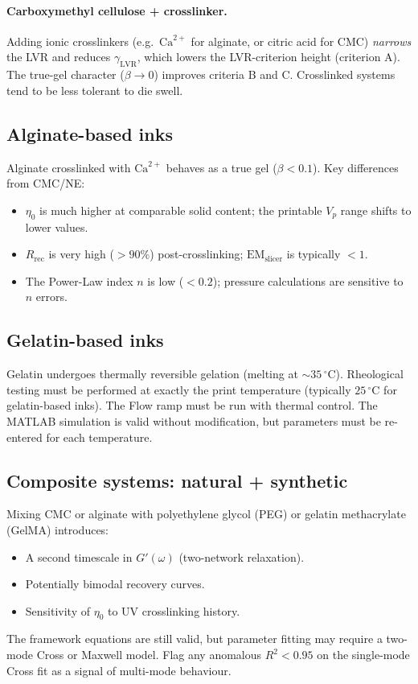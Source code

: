 \documentclass[11pt,a4paper]{article}
\begin{document}
\paragraph{Carboxymethyl cellulose + crosslinker.} Adding ionic
crosslinkers (e.g.\ $\mathrm{Ca}^{2+}$ for alginate, or citric acid
for CMC) \emph{narrows} the LVR and reduces $\gamma_\mathrm{LVR}$, which
lowers the LVR-criterion height (criterion A). The true-gel character
($\beta\to 0$) improves criteria B and C. Crosslinked systems tend to
be less tolerant to die swell.

\subsection{Alginate-based inks}

Alginate crosslinked with $\mathrm{Ca}^{2+}$ behaves as a true gel
($\beta<0.1$). Key differences from CMC/NE:
\begin{itemize}[leftmargin=1.6em,itemsep=2pt]
\item $\eta_0$ is much higher at comparable solid content; the
  printable $V_p$ range shifts to lower values.
\item $R_\mathrm{rec}$ is very high ($>90\%$) post-crosslinking;
  $\mathrm{EM}_\mathrm{slicer}$ is typically $<1$.
\item The Power-Law index $n$ is low ($<0.2$); pressure calculations
  are sensitive to $n$ errors.
\end{itemize}

\subsection{Gelatin-based inks}

Gelatin undergoes thermally reversible gelation (melting at $\sim 35\,^\circ$C).
Rheological testing must be performed at exactly the print temperature
(typically $25\,^\circ$C for gelatin-based inks). The Flow ramp must
be run with thermal control. The MATLAB simulation is valid without
modification, but parameters must be re-entered for each temperature.

\subsection{Composite systems: natural + synthetic}

Mixing CMC or alginate with polyethylene glycol (PEG) or gelatin
methacrylate (GelMA) introduces:
\begin{itemize}[leftmargin=1.6em,itemsep=2pt]
\item A second timescale in $G'(\omega)$ (two-network relaxation).
\item Potentially bimodal recovery curves.
\item Sensitivity of $\eta_0$ to UV crosslinking history.
\end{itemize}
The framework equations are still valid, but parameter fitting may require
a two-mode Cross or Maxwell model. Flag any anomalous $R^2<0.95$ on the
single-mode Cross fit as a signal of multi-mode behaviour.
\end{document}
